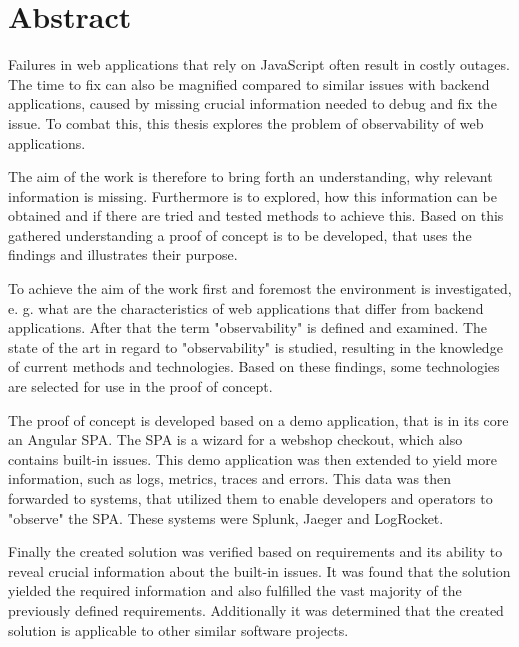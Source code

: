 \newpage{}

\section*{\thispagestyle{empty}Abstract}

Failures in web applications that rely on JavaScript often result in costly outages. The time to fix can also be magnified compared to similar issues with backend applications, caused by missing crucial information needed to debug and fix the issue. To combat this, this thesis explores the problem of observability of web applications.

The aim of the work is therefore to bring forth an understanding, why relevant information is missing. Furthermore is to explored, how this information can be obtained and if there are tried and tested methods to achieve this. Based on this gathered understanding a proof of concept is to be developed, that uses the findings and illustrates their purpose.

To achieve the aim of the work first and foremost the environment is investigated, e. g. what are the characteristics of web applications that differ from backend applications. After that the term "observability" is defined and examined. The state of the art in regard to "observability" is studied, resulting in the knowledge of current methods and technologies. Based on these findings, some technologies are selected for use in the proof of concept.

The proof of concept is developed based on a demo application, that is in its core an Angular SPA. The SPA is a wizard for a webshop checkout, which also contains built-in issues. This demo application was then extended to yield more information, such as logs, metrics, traces and errors. This data was then forwarded to systems, that utilized them to enable developers and operators to "observe" the SPA. These systems were Splunk, Jaeger and LogRocket.

Finally the created solution was verified based on requirements and its ability to reveal crucial information about the built-in issues. It was found that the solution yielded the required information and also fulfilled the vast majority of the previously defined requirements. Additionally it was determined that the created solution is applicable to other similar software projects.